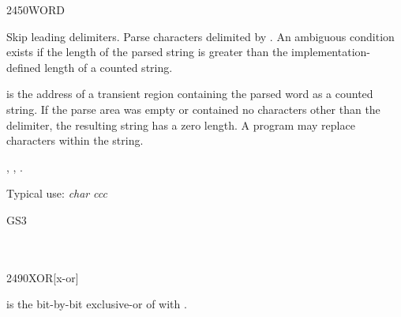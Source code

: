 \begin{worddef}{2450}{WORD}
\item {}

	Skip leading delimiters. Parse characters  delimited
	by .  An ambiguous condition exists if the length of
	the parsed string is greater than the implementation-defined
	length of a counted string.

	 is the address of a transient region containing
	the parsed word as a counted string. If the parse area was
	empty or contained no characters other than the delimiter, the
	resulting string has a zero length.
	A program may replace characters within the string.

\see {},
	,
	.

	\begin{rationale} %
		Typical use: \emph{char}  \emph{ccc}
	\end{rationale}

	\begin{testing} %
		\ttfamily
		\word{:} GS3     \word{;} \\
		 \\
		 \\
		 \hfill {} 
	\end{testing}
\end{worddef}


\begin{worddef}{2490}{XOR}[x-or]
\item {}

	 is the bit-by-bit exclusive-or of  with
	.

	\begin{testing} %
		 \\
		 \\
		 \\
	\end{testing}
\end{worddef}


